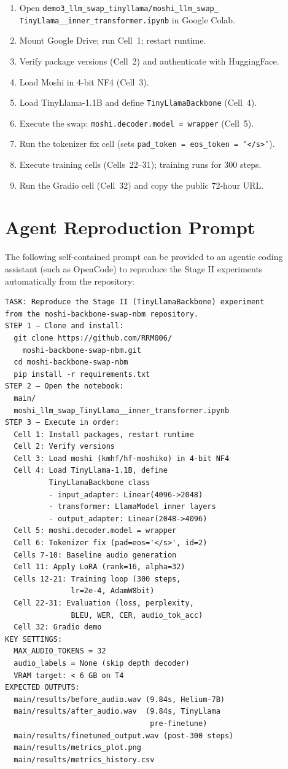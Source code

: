 \documentclass[conference]{IEEEtran}
\begin{document}
\begin{enumerate}
  \item Open \texttt{demo3\_llm\_swap\_tinyllama/moshi\_llm\_swap\_\\
        TinyLlama\_\_inner\_transformer.ipynb} in Google Colab.
  \item Mount Google Drive; run Cell~1; restart runtime.
  \item Verify package versions (Cell~2) and authenticate with HuggingFace.
  \item Load Moshi in 4-bit NF4 (Cell~3).
  \item Load TinyLlama-1.1B and define \texttt{TinyLlamaBackbone} (Cell~4).
  \item Execute the swap: \texttt{moshi.decoder.model = wrapper} (Cell~5).
  \item Run the tokenizer fix cell (sets \texttt{pad\_token = eos\_token = `</s>'}).
  \item Execute training cells (Cells~22--31); training runs for 300 steps.
  \item Run the Gradio cell (Cell~32) and copy the public 72-hour URL.
\end{enumerate}

\section{Agent Reproduction Prompt}
\label{app:agent}
The following self-contained prompt can be provided to an agentic coding
assistant (such as OpenCode) to reproduce the Stage II experiments
automatically from the repository:
\begin{verbatim}
TASK: Reproduce the Stage II (TinyLlamaBackbone) experiment
from the moshi-backbone-swap-nbm repository.
STEP 1 — Clone and install:
  git clone https://github.com/RRM006/
    moshi-backbone-swap-nbm.git
  cd moshi-backbone-swap-nbm
  pip install -r requirements.txt
STEP 2 — Open the notebook:
  main/
  moshi_llm_swap_TinyLlama__inner_transformer.ipynb
STEP 3 — Execute in order:
  Cell 1: Install packages, restart runtime
  Cell 2: Verify versions
  Cell 3: Load moshi (kmhf/hf-moshiko) in 4-bit NF4
  Cell 4: Load TinyLlama-1.1B, define
          TinyLlamaBackbone class
          - input_adapter: Linear(4096->2048)
          - transformer: LlamaModel inner layers
          - output_adapter: Linear(2048->4096)
  Cell 5: moshi.decoder.model = wrapper
  Cell 6: Tokenizer fix (pad=eos='</s>', id=2)
  Cells 7-10: Baseline audio generation
  Cell 11: Apply LoRA (rank=16, alpha=32)
  Cells 12-21: Training loop (300 steps,
               lr=2e-4, AdamW8bit)
  Cell 22-31: Evaluation (loss, perplexity,
               BLEU, WER, CER, audio_tok_acc)
  Cell 32: Gradio demo
KEY SETTINGS:
  MAX_AUDIO_TOKENS = 32
  audio_labels = None (skip depth decoder)
  VRAM target: < 6 GB on T4
EXPECTED OUTPUTS:
  main/results/before_audio.wav (9.84s, Helium-7B)
  main/results/after_audio.wav  (9.84s, TinyLlama
                                 pre-finetune)
  main/results/finetuned_output.wav (post-300 steps)
  main/results/metrics_plot.png
  main/results/metrics_history.csv
\end{verbatim}
\end{document}
